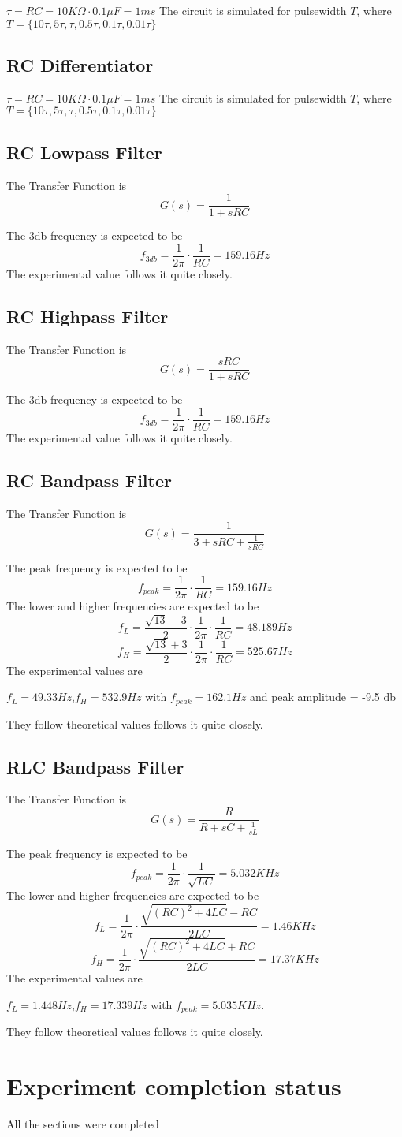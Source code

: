 \documentclass[12pt]{article}
\begin{document}
$\tau= RC = 10K\Omega \cdot 0.1\mu F=1ms$ The circuit is simulated for 
pulsewidth $T$, where $T=\{10\tau,5\tau,\tau,0.5\tau,0.1\tau,0.01\tau\}$

\subsection{RC Differentiator}
$\tau= RC = 10K\Omega \cdot 0.1\mu F=1ms$ The circuit is simulated for 
pulsewidth $T$, where $T=\{10\tau,5\tau,\tau,0.5\tau,0.1\tau,0.01\tau\}$

\subsection{RC Lowpass Filter}
The Transfer Function is $$G(s)=\frac{1}{1+sRC}$$

The 3db frequency is expected to be $$f_{3db}=\frac{1}{2\pi}\cdot\frac{1}{RC}=159.16Hz$$
The experimental value follows it quite closely.
\subsection{RC Highpass Filter}
The Transfer Function is $$G(s)=\frac{sRC}{1+sRC}$$

The 3db frequency is expected to be $$f_{3db}=\frac{1}{2\pi}\cdot\frac{1}{RC}=159.16Hz$$ 
The experimental value follows it quite closely.

\subsection{RC Bandpass Filter}
The Transfer Function is $$G(s)=\frac{1}{3+sRC+\frac{1}{sRC}}$$

The peak frequency is expected to be $$f_{peak}=\frac{1}{2\pi}\cdot\frac{1}{RC}=159.16Hz$$ 
The lower and higher frequencies are expected to be 
$$f_{L}=\frac{\sqrt{13}-3}{2}\cdot\frac{1}{2\pi}\cdot\frac{1}{RC}=48.189Hz$$ 
$$f_{H}=\frac{\sqrt{13}+3}{2}\cdot\frac{1}{2\pi}\cdot\frac{1}{RC}=525.67Hz$$
The experimental values are 

$f_{L}=49.33Hz$,$f_{H}=532.9Hz$ with $f_{peak}=162.1Hz$ and peak amplitude = -9.5 db

They follow theoretical values follows it quite closely.
\subsection{RLC Bandpass Filter}
The Transfer Function is $$G(s)=\frac{R}{R+sC+\frac{1}{sL}}$$

The peak frequency is expected to be $$f_{peak}=\frac{1}{2\pi}\cdot\frac{1}{\sqrt{LC}}=5.032KHz$$ 
The lower and higher frequencies are expected to be 
$$f_{L}=\frac{1}{2\pi}\cdot\frac{\sqrt{(RC)^{2}+4LC}-RC}{2LC}=1.46KHz$$ 
$$f_{H}=\frac{1}{2\pi}\cdot\frac{\sqrt{(RC)^{2}+4LC}+RC}{2LC}=17.37KHz$$
The experimental values are 

$f_{L}=1.448Hz$,$f_{H}=17.339Hz$ with $f_{peak}=5.035KHz$.

They follow theoretical values follows it quite closely.

\section{Experiment completion status}
All the sections were completed
\end{document}
